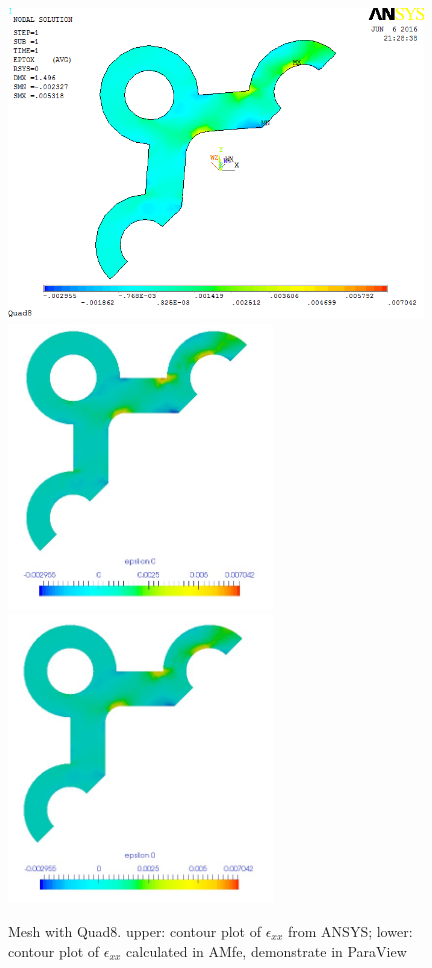 \begin{figure}[htbp]
	\begin{center}
		\includegraphics[width=11cm,clip]{Quad8_Exx.png} 	
		\includegraphics[width=7cm,clip]{Quad8_Exx_PD.png} 	
		\includegraphics[width=7cm,clip]{Quad8_Exx_P.png} 		
		\caption{Mesh with Quad8. upper: contour plot of $\epsilon_{xx}$ from ANSYS; lower: contour plot of $\epsilon_{xx}$ calculated in AMfe, demonstrate in ParaView} \label{fig: Quad8_Exx}
	\end{center}
\end{figure}
\clearpage 

